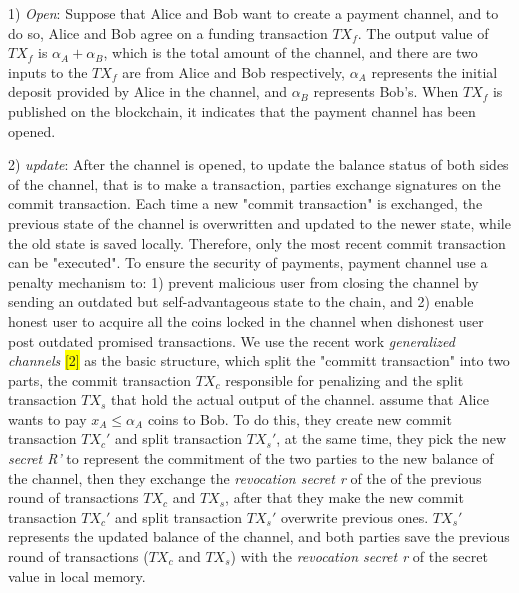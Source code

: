 \documentclass[conference]{IEEEtran}
\begin{document}
1) \emph{Open}: Suppose that Alice and Bob want to create a payment channel, and to do so, Alice and Bob agree on a funding
transaction $TX_f$. The output value of $TX_f$ is $\alpha_A+\alpha_B$, which is the total amount of the channel, and there are two inputs 
to the $TX_f$ are from Alice and Bob respectively, $\alpha_A$ represents the initial deposit provided by Alice in the channel, and 
$\alpha_B$ represents Bob's. When $TX_f$ is published on the blockchain, it indicates that the payment channel has been opened.

2) \emph{update}: After the channel is opened, to update the balance status of both sides of the channel, that is to make a transaction, 
parties exchange signatures on the commit transaction. Each time a new "commit transaction" is exchanged, the previous state of the channel 
is overwritten and updated to the newer state, while the old state is saved locally. Therefore, only the most recent commit transaction 
can be "executed". To ensure the security of payments, payment channel use a penalty mechanism to: 1) prevent malicious user from closing 
the channel by sending an outdated but self-advantageous state to the chain, and 2) enable honest user to acquire all the coins locked in the 
channel when dishonest user post outdated promised transactions. We use the recent work \emph{generalized channels} \colorbox{yellow}{[2]} 
as the basic structure, which split the "committ transaction" into two parts, the commit transaction $TX_c$ responsible for penalizing and 
the split transaction $TX_s$ that hold the actual output of the channel. assume that Alice wants to pay $x_A \leq \alpha_A$ coins to Bob. 
To do this, they create new commit transaction $TX_c'$ and split transaction $TX_s'$, at the same time, they pick the new \emph{secret R'} 
to represent the commitment of the two parties to the new balance of the channel, then they exchange the \emph{revocation secret r} of the 
of the previous round of transactions $TX_c$ and $TX_s$, after that they make the new commit transaction $TX_c'$ and split transaction $TX_s'$ 
overwrite previous ones. $TX_s'$ represents the updated balance of the channel, and both parties save the previous 
round of transactions ($TX_c$ and $TX_s$) with the \emph{revocation secret r} of the secret value in local memory.
\end{document}
